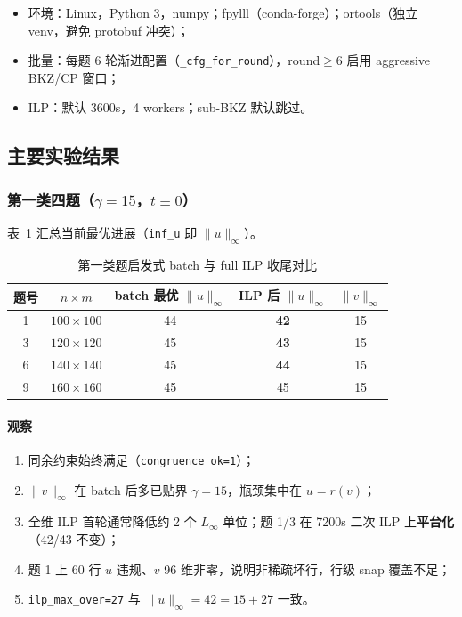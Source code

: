 \documentclass[12pt,a4paper]{ctexart}
\begin{document}
\begin{itemize}
  \item 环境：Linux，Python 3，numpy；fpylll（conda-forge）；ortools（独立 venv，避免 protobuf 冲突）；
  \item 批量：每题 6 轮渐进配置（\texttt{\_cfg\_for\_round}），round$\ge 6$ 启用 aggressive BKZ/CP 窗口；
  \item ILP：默认 3600s，4 workers；sub-BKZ 默认跳过。
\end{itemize}

\subsection{主要实验结果}

\subsubsection{第一类四题（$\gamma=15$，$t\equiv 0$）}

表~\ref{tab:class1} 汇总当前最优进展（\texttt{inf\_u} 即 $\|u\|_{\infty}$）。

\begin{table}[htbp]
  \centering
  \caption{第一类题启发式 batch 与 full ILP 收尾对比}
  \label{tab:class1}
  \begin{tabular}{ccccc}
    \toprule
    题号 & $n\times m$ & batch 最优 $\|u\|_{\infty}$ & ILP 后 $\|u\|_{\infty}$ & $\|v\|_{\infty}$ \\
    \midrule
    1 & $100\times100$ & 44 & \textbf{42} & 15 \\
    3 & $120\times120$ & 45 & \textbf{43} & 15 \\
    6 & $140\times140$ & 45 & \textbf{44} & 15 \\
    9 & $160\times160$ & 45 & 45 & 15 \\
    \bottomrule
  \end{tabular}
\end{table}

\paragraph{观察}
\begin{enumerate}
  \item 同余约束始终满足（\texttt{congruence\_ok=1}）；
  \item $\|v\|_{\infty}$ 在 batch 后多已贴界 $\gamma=15$，瓶颈集中在 $u=r(v)$；
  \item 全维 ILP 首轮通常降低约 2 个 $L_{\infty}$ 单位；题 1/3 在 7200s 二次 ILP 上\textbf{平台化}（42/43 不变）；
  \item 题 1 上 60 行 $u$ 违规、$v$ 96 维非零，说明非稀疏坏行，行级 snap 覆盖不足；
  \item \texttt{ilp\_max\_over=27} 与 $\|u\|_{\infty}=42=15+27$ 一致。
\end{enumerate}
\end{document}
